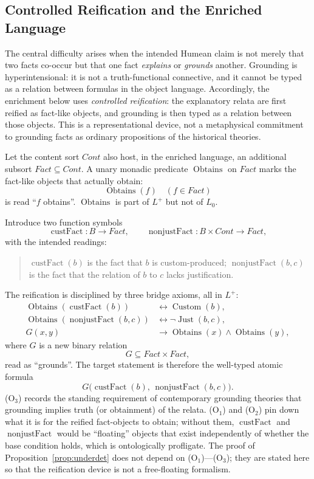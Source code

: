 \subsection{Controlled Reification and the Enriched Language}
\label{sec:enrichment}

The central difficulty arises when the intended Humean claim is not
merely that two facts co-occur but that one fact \emph{explains} or
\emph{grounds} another. Grounding is hyperintensional: it is not a
truth-functional connective, and it cannot be typed as a relation
between formulas in the object language. Accordingly, the
enrichment below uses \emph{controlled reification}: the explanatory
relata are first reified as fact-like objects, and grounding is then
typed as a relation between those objects. This is a
representational device, not a metaphysical commitment to grounding
facts as ordinary propositions of the historical theories.

Let the content sort $\mathit{Cont}$ also host, in the enriched
language, an additional subsort $\mathit{Fact}\subseteq\mathit{Cont}$.
A unary monadic predicate $\operatorname{Obtains}$ on $\mathit{Fact}$
marks the fact-like objects that actually obtain:
\[
\operatorname{Obtains}(f) \quad (f\in\mathit{Fact})
\]
is read ``$f$ obtains''. $\operatorname{Obtains}$ is part of $L^+$
but not of $L_0$.

Introduce two function symbols
\[
\operatorname{custFact}:B\to\mathit{Fact},
\qquad
\operatorname{nonjustFact}:B\times\mathit{Cont}\to\mathit{Fact},
\]
with the intended readings:
\begin{quote}
$\operatorname{custFact}(b)$ is the fact that $b$ is
custom-produced; $\operatorname{nonjustFact}(b,c)$ is the fact that
the relation of $b$ to $c$ lacks justification.
\end{quote}
The reification is disciplined by three bridge axioms, all in $L^+$:
\begin{align*}
\operatorname{Obtains}(\operatorname{custFact}(b))
&\leftrightarrow \operatorname{Custom}(b), \tag{O$_1$} \\
\operatorname{Obtains}(\operatorname{nonjustFact}(b,c))
&\leftrightarrow \neg\operatorname{Just}(b,c), \tag{O$_2$} \\
G(x,y) &\rightarrow \operatorname{Obtains}(x)\land\operatorname{Obtains}(y),
\tag{O$_3$}
\end{align*}
where $G$ is a new binary relation
\[
G\subseteq \mathit{Fact}\times\mathit{Fact},
\]
read as ``grounds''. The target statement is therefore the
well-typed atomic formula
\[
G\bigl(\operatorname{custFact}(b),\,
       \operatorname{nonjustFact}(b,c)\bigr).
\tag{G}
\]
(O$_3$) records the standing requirement of contemporary grounding
theories that grounding implies truth (or obtainment) of the
relata. (O$_1$) and (O$_2$) pin down what it is for the reified
fact-objects to obtain; without them, $\operatorname{custFact}$ and
$\operatorname{nonjustFact}$ would be ``floating'' objects that
exist independently of whether the base condition holds, which is
ontologically profligate. The proof of Proposition~\ref{prop:underdet}
does not depend on (O$_1$)---(O$_3$); they are stated here so that
the reification device is not a free-floating formalism.

